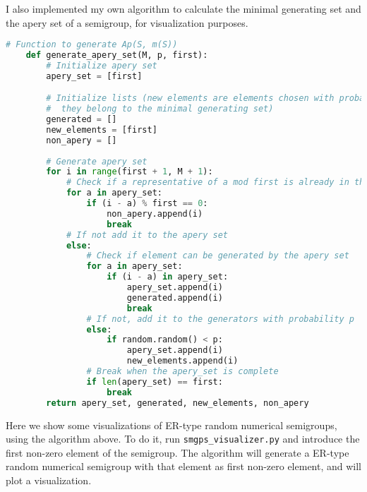 I also implemented my own algorithm to calculate the minimal generating set and the apery set of a semigroup, for visualization purposes.

\begin{lstlisting}[language=Python]
    # Function to generate Ap(S, m(S))
    def generate_apery_set(M, p, first): 
        # Initialize apery set
        apery_set = [first]

        # Initialize lists (new elements are elements chosen with probability p,
        #  they belong to the minimal generating set)
        generated = []
        new_elements = [first]
        non_apery = []
        
        # Generate apery set
        for i in range(first + 1, M + 1):
            # Check if a representative of a mod first is already in the apery set
            for a in apery_set:
                if (i - a) % first == 0:
                    non_apery.append(i)
                    break
            # If not add it to the apery set
            else:
                # Check if element can be generated by the apery set
                for a in apery_set: 
                    if (i - a) in apery_set:
                        apery_set.append(i)
                        generated.append(i)
                        break 
                # If not, add it to the generators with probability p
                else:
                    if random.random() < p:
                        apery_set.append(i)
                        new_elements.append(i)
                # Break when the apery_set is complete 
                if len(apery_set) == first:
                    break
        return apery_set, generated, new_elements, non_apery
\end{lstlisting}

Here we show some visualizations of ER-type random numerical semigroups, using the algorithm above. To do it, run \verb|smgps_visualizer.py| and introduce the first non-zero element of the semigroup. The algorithm will generate a ER-type random numerical semigroup with that element as first non-zero element, and will plot a visualization. 






